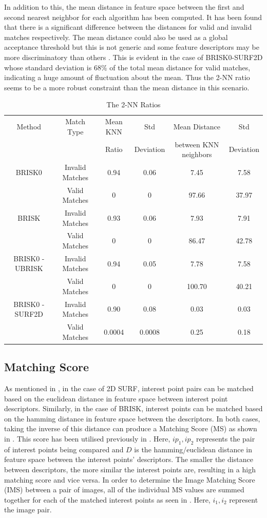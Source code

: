 \documentclass{report}
\begin{document}
In addition to this, the mean distance in feature space between the first and second nearest neighbor for each algorithm has been computed. It has been found that there is a significant difference between the distances for valid and invalid matches respectively. The mean distance could also be used as a global acceptance threshold but this is not generic and some feature descriptors may be more discriminatory than others \cite{Lowe2004}. This is evident in the case of BRISK0-SURF2D whose standard deviation is $68\%$ of the total mean distance for valid matches, indicating a huge amount of fluctuation about the mean. Thus the 2-NN ratio seems to be a more robust constraint than the mean distance in this scenario.\\

\begin{table}
\caption{The 2-NN Ratios}
\footnotesize
\begin{tabular}{|c|c|c|c|c|c|}
\hline 
Method & Match Type & Mean KNN & Std  & Mean Distance  & Std \tabularnewline
 &  &  Ratio & Deviation & between KNN neighbors & Deviation\tabularnewline
\hline 
\hline 
BRISK0 & Invalid Matches & 0.94 & 0.06 & 7.45 & 7.58\tabularnewline
\hline 
 & Valid Matches & 0 & 0 & 97.66 & 37.97\tabularnewline
\hline 
BRISK & Invalid Matches & 0.93 & 0.06 & 7.93 & 7.91\tabularnewline
\hline 
 & Valid Matches & 0 & 0 & 86.47 & 42.78\tabularnewline
\hline 
BRISK0 - UBRISK & Invalid Matches & 0.94 & 0.05 & 7.78 & 7.58\tabularnewline
\hline 
 & Valid Matches & 0 & 0 & 100.70 & 40.21\tabularnewline
\hline 
BRISK0 - SURF2D & Invalid Matches & 0.90 & 0.08 & 0.03 & 0.03\tabularnewline
\hline 
 & Valid Matches & 0.0004 & 0.0008 & 0.25 & 0.18\tabularnewline
\hline 
\end{tabular}
\label{tab:knnCriterion}
\end{table}

\subsection{Matching Score}
\label{sec:matchingScore}
As mentioned in , in the case of 2D SURF, interest point pairs can be matched based on the euclidean distance in feature space between interest point descriptors. Similarly, in the case of BRISK, interest points can be matched based on the hamming distance in feature space between the descriptors. In both cases, taking the inverse of this distance can produce a Matching Score (MS) as shown in . This score has been utilised previously in \cite{AndersonTechnical, Briggs}. Here, $ip_1, ip_2$ represents the pair of interest points being compared and $D$ is the hamming/euclidean distance in feature space between the interest points' descriptors. The smaller the distance between descriptors, the more similar the interest points are, resulting in a high matching score and vice versa. In order to determine the Image Matching Score (IMS) between a pair of images, all of the individual MS values are summed together for each of the matched interest points as seen in . Here, $i_1, i_2$ represent the image pair. \\
\end{document}

